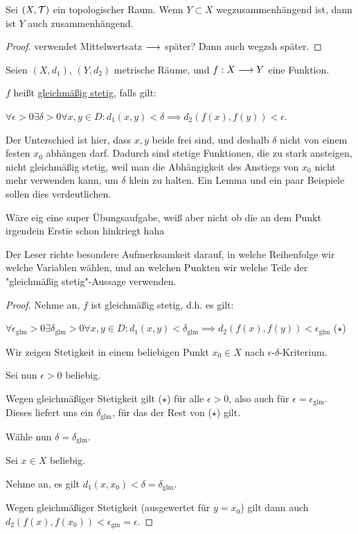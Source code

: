 \begin{lemma}
    Sei $(X, \mathcal{T})$ ein topologischer Raum. Wenn $Y \subset X$ wegzusammenhängend ist, dann ist $Y$ auch zusammenhängend.
\end{lemma}
\begin{proof}
    verwendet Mittelwertsatz $\longrightarrow$ später? Dann auch wegzsh später.
\end{proof}

\begin{definition}
    Seien $(X, d_1)$, $(Y, d_2)$ metrische Räume, und $f: X \longrightarrow Y$ eine Funktion.
    
    $f$ heißt \underline{gleichmäßig stetig}, falls gilt:
    
    $\forall \epsilon > 0 \exists \delta > 0 \forall x, y \in D: d_1(x,y) < \delta \implies d_2(f(x),f(y)) < \epsilon$.
\end{definition}

Der Unterschied ist hier, dass $x, y$ beide frei sind, und deshalb $\delta$ nicht von einem festen $x_0$ abhängen darf. Dadurch sind stetige Funktionen, die zu stark ansteigen, nicht gleichmäßig stetig, weil man die Abhängigkeit des Anstiegs von $x_0$ nicht mehr verwenden kann, um $\delta$ klein zu halten. Ein Lemma und ein paar Beispiele sollen dies verdeutlichen.

\begin{lemma}
    Wäre eig eine super Übungsaufgabe, weiß aber nicht ob die an dem Punkt irgendein Erstie schon hinkriegt haha

    
\end{lemma}

Der Leser richte besondere Aufmerksamkeit darauf, in welche Reihenfolge wir welche Variablen wählen, und an welchen Punkten wir welche Teile der "gleichmäßig stetig"-Aussage verwenden.

\begin{proof}
    Nehme an, $f$ ist gleichmäßig stetig, d.h. es gilt:
    
    $\forall \epsilon_{\text{glm}} > 0 \exists \delta_{\text{glm}} > 0 \forall x, y \in D: d_1(x,y) < \delta_{\text{glm}} \implies d_2(f(x),f(y)) < \epsilon_{\text{glm}}$ ($\star$)
    
    Wir zeigen Stetigkeit in einem beliebigen Punkt $x_0 \in X$ nach $\epsilon$-$\delta$-Kriterium.
    
    Sei nun $\epsilon > 0$ beliebig.

    Wegen gleichmäßiger Stetigkeit gilt ($\star$) für alle $\epsilon > 0$, also auch für $\epsilon = \epsilon_{\text{glm}}$. Dieses liefert uns ein $\delta_{\text{glm}}$, für das der Rest von ($\star$) gilt.

    Wähle nun $\delta = \delta_{\text{glm}}$.

    Sei $x \in X$ beliebig.

    Nehme an, es gilt $d_1(x,x_0) < \delta = \delta_{\text{glm}}$.

    Wegen gleichmäßiger Stetigkeit (ausgewertet für $y = x_0$) gilt dann auch $d_2(f(x),f(x_0)) < \epsilon_{\text{gm}} = \epsilon$.
\end{proof}

